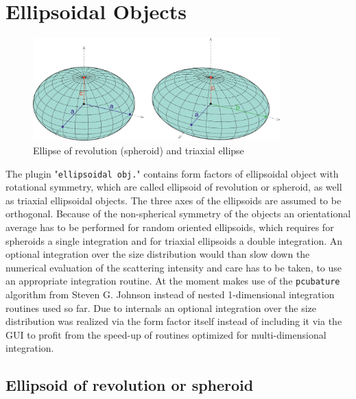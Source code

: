 \clearpage
\section{Ellipsoidal Objects}
\label{sect:EllipsoidalObjects}
\begin{figure}[htb]
\begin{center}
\includegraphics[width=0.85\textwidth]{../images/form_factor/Ellipsoid/Ellipsoide.png}
\end{center}
\caption{Ellipse of revolution (spheroid) and triaxial ellipse}
\label{fig:EllipsoidalObjects}
\end{figure}

The plugin "\texttt{ellipsoidal obj.}" contains form factors of ellipsoidal object with rotational symmetry, which are called ellipsoid of revolution or spheroid, as well as triaxial ellipsoidal objects. The three axes of the ellipsoids are assumed to be orthogonal. Because of the non-spherical symmetry of the objects an orientational average has to be performed for random oriented ellipsoids, which requires for spheroids a single integration and for triaxial ellipsoids a double integration. An optional integration over the size distribution would than slow down the numerical evaluation of the scattering intensity and care has to be taken, to use an appropriate integration routine. At the moment \SASfit makes use of the \texttt{pcubature} algorithm from Steven G. Johnson \cite{Johnson} instead of nested 1-dimensional integration routines used so far. Due to \SASfit internals an optional integration over the size distribution was realized via the form factor itself instead of including it via the GUI to profit from the speed-up of routines optimized for multi-dimensional integration.

\subsection{Ellipsoid of revolution or spheroid}
\label{sec:Spheroid}~\\


